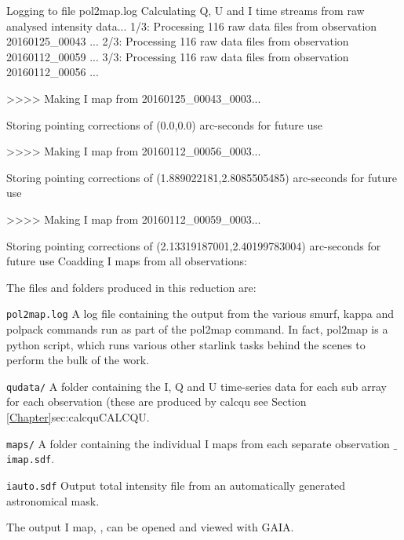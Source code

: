 \begin{terminalv}
Logging to file pol2map.log
Calculating Q, U and I time streams from raw analysed intensity data...
   1/3: Processing 116 raw data files from observation 20160125_00043 ...
   2/3: Processing 116 raw data files from observation 20160112_00059 ...
   3/3: Processing 116 raw data files from observation 20160112_00056 ...

>>>>   Making I map from 20160125_00043_0003...

Storing pointing corrections of (0.0,0.0) arc-seconds for future use

>>>>   Making I map from 20160112_00056_0003...

Storing pointing corrections of (1.889022181,2.8085505485) arc-seconds for future use

>>>>   Making I map from 20160112_00059_0003...

Storing pointing corrections of (2.13319187001,2.40199783004) arc-seconds for future use
Coadding I maps from all observations:
\end{terminalv}

The files and folders produced in this reduction are:


\begin{aligndesc}
\item[\texttt{pol2map.log}] A log file containing the output from the
  various smurf, kappa and polpack commands run as part of the pol2map
  command. In fact, pol2map is a python script, which runs various other
  starlink tasks behind the scenes to perform the bulk of the work.

\item[\texttt{qudata/}] A folder containing the I, Q and U time-series data
  for each sub array for each observation (these are produced by
  calcqu see Section \cref{Chapter}{sec:calcqu}{CALCQU}.

\item[\texttt{maps/}] A folder containing the individual I maps from
  each separate observation \texttt{$\_$imap.sdf}.

\item[\texttt{iauto.sdf}] Output total intensity file from an
  automatically generated astronomical mask.


\end{aligndesc}

The output I map, , can be opened and viewed with GAIA.

